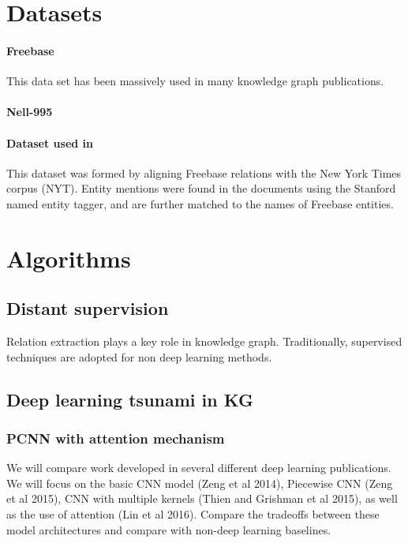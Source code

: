 \documentclass{article}
\begin{document}
\section{Datasets}
	
	\paragraph{Freebase} This data set has been massively used in many knowledge graph publications.
	
	\paragraph{Nell-995}
	
	\paragraph{Dataset used in \citet{Riedel2010}} This dataset was formed by aligning Freebase relations with the New York Times corpus (NYT). Entity mentions were found in the documents using the Stanford named entity tagger, and are further matched to the names of Freebase entities.

  
\section{Algorithms}

\subsection{Distant supervision}
	Relation extraction plays a key role in knowledge graph. Traditionally, supervised techniques are adopted for non deep learning methods. \citet{Mintz:2009:DSR:1690219.1690287}

\subsection{Deep learning tsunami in KG}

\subsubsection{PCNN with attention mechanism}
	We will compare work developed in several different deep learning publications. We will focus on the basic CNN model (Zeng et al 2014), Piecewise CNN (Zeng et al 2015), CNN with multiple kernels (Thien and Grishman et al 2015), as well as the use of attention (Lin et al 2016). Compare the tradeoffs between these model architectures and compare with non-deep learning baselines. \citet{DBLP:conf/acl/LinSLLS16}
	
\end{document}
